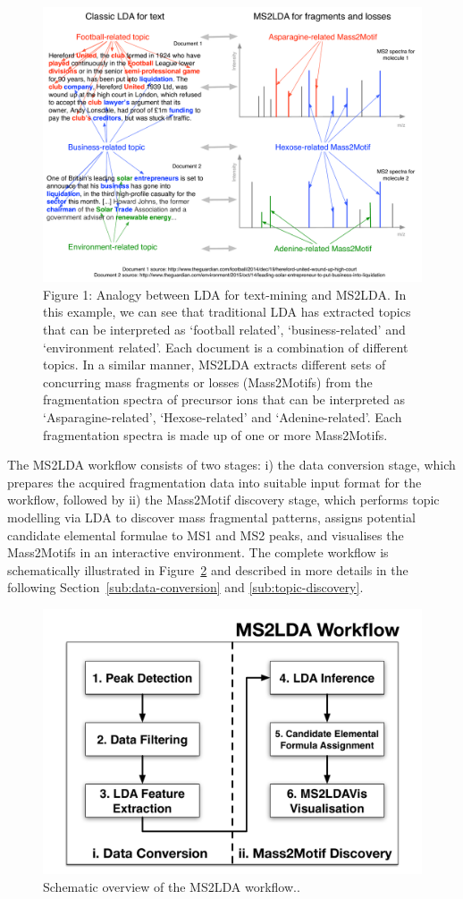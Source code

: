 \begin{figure}[!htbp]
\centering\includegraphics[width=0.7\linewidth]{07-lda/figures/text2frags.pdf}
\centering\caption{Figure 1: Analogy between LDA for text-mining and MS2LDA. In this example, we can see that traditional LDA has extracted topics that can be interpreted as ‘football related’, ‘business-related’ and ‘environment related’. Each document is a combination of different topics. In a similar manner, MS2LDA extracts different sets of concurring mass fragments or losses (Mass2Motifs) from the fragmentation spectra of precursor ions that can be interpreted as ‘Asparagine-related’, ‘Hexose-related’ and ‘Adenine-related’. Each fragmentation spectra is made up of one or more Mass2Motifs.\label{fig:text2frags}}
\end{figure}

The MS2LDA workflow consists of two stages: i) the data conversion stage, which prepares the acquired fragmentation data into suitable input format for the workflow, followed by ii) the Mass2Motif discovery stage, which performs topic modelling via LDA to discover mass fragmental patterns, assigns potential candidate elemental formulae to MS1 and MS2 peaks, and visualises the Mass2Motifs in an interactive environment. The complete workflow is schematically illustrated in Figure~\ref{fig:m2lda-workflow} and described in more details in the following Section~\ref{sub:data-conversion} and \ref{sub:topic-discovery}.

\begin{figure}[!htbp]
\centering\includegraphics[width=0.8\linewidth]{07-lda/figures/ms2lda.pdf}
\centering\caption{Schematic overview of the MS2LDA workflow..\label{fig:m2lda-workflow}}
\end{figure}

